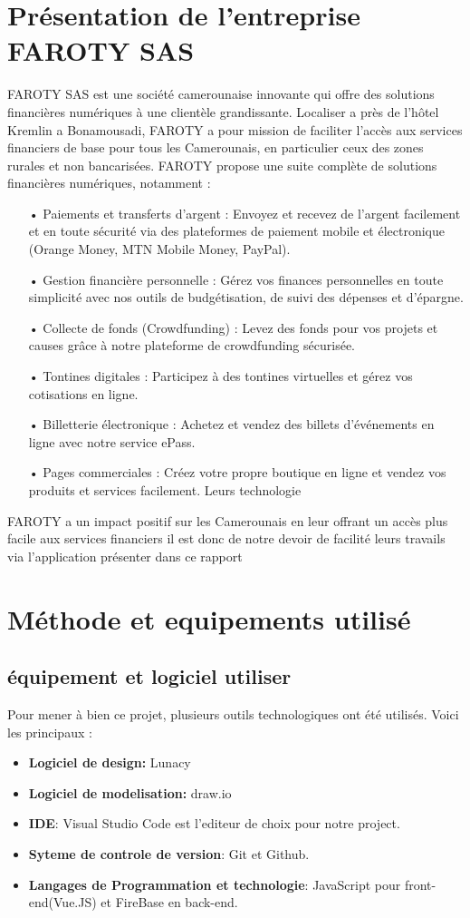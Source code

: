 \documentclass[a4paper,12pt]{report}
\begin{document}
\chapter{Présentation de l'entreprise FAROTY SAS} 
FAROTY SAS est une société camerounaise innovante qui offre des solutions financières numériques à une clientèle grandissante. Localiser a près de l’hôtel Kremlin a Bonamousadi, FAROTY a pour mission de faciliter l'accès aux services financiers de base pour tous les Camerounais, en particulier ceux des zones rurales et non bancarisées.
FAROTY propose une suite complète de solutions financières numériques, notamment :
\begin{itemize}
\item[•] Paiements et transferts d'argent : Envoyez et recevez de l'argent facilement et en toute sécurité via des plateformes de paiement mobile et électronique (Orange Money, MTN Mobile Money, PayPal). 
\item[•] Gestion financière personnelle : Gérez vos finances personnelles en toute simplicité avec nos outils de budgétisation, de suivi des dépenses et d'épargne. 
\item[•] Collecte de fonds (Crowdfunding) : Levez des fonds pour vos projets et causes grâce à notre plateforme de crowdfunding sécurisée. 
\item[•] Tontines digitales : Participez à des tontines virtuelles et gérez vos cotisations en ligne. 
\item[•] Billetterie électronique : Achetez et vendez des billets d'événements en ligne avec notre service ePass. 
\item[•] Pages commerciales : Créez votre propre boutique en ligne et vendez vos produits et services facilement. 
Leurs technologie
\end{itemize} 
FAROTY a un impact positif sur les Camerounais en leur offrant un accès plus facile aux services financiers il est donc de notre devoir de facilité leurs travails via l'application présenter dans ce rapport

\chapter{Méthode et equipements utilisé}
\section{équipement et logiciel utiliser}

Pour mener à bien ce projet, plusieurs outils technologiques ont été utilisés. Voici les principaux :
\begin{itemize}
\item\textbf{Logiciel de design:} Lunacy
\item\textbf{Logiciel de modelisation:} draw.io
\item\textbf{IDE}: Visual Studio Code est l'editeur de choix pour notre project.
\item\textbf{Syteme de controle de version}: Git et Github.
\item\textbf{Langages de Programmation et technologie}: JavaScript pour front-end(Vue.JS) et FireBase en back-end.
\end{itemize}
\end{document}
